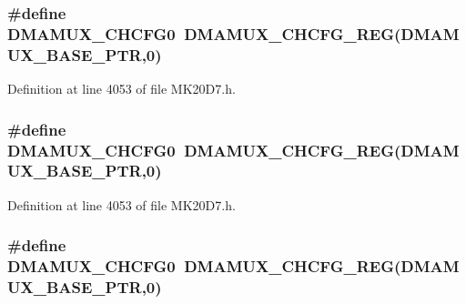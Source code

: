 \subsubsection[{\texorpdfstring{D\+M\+A\+M\+U\+X\+\_\+\+C\+H\+C\+F\+G0}{DMAMUX_CHCFG0}}]{\setlength{\rightskip}{0pt plus 5cm}\#define D\+M\+A\+M\+U\+X\+\_\+\+C\+H\+C\+F\+G0~{\bf D\+M\+A\+M\+U\+X\+\_\+\+C\+H\+C\+F\+G\+\_\+\+R\+EG}({\bf D\+M\+A\+M\+U\+X\+\_\+\+B\+A\+S\+E\+\_\+\+P\+TR},0)}\hypertarget{group___d_m_a_m_u_x___register___accessor___macros_gaf1b9c5ddea4b98f2bbe2679878579c15}{}\label{group___d_m_a_m_u_x___register___accessor___macros_gaf1b9c5ddea4b98f2bbe2679878579c15}


Definition at line 4053 of file M\+K20\+D7.\+h.

\subsubsection[{\texorpdfstring{D\+M\+A\+M\+U\+X\+\_\+\+C\+H\+C\+F\+G0}{DMAMUX_CHCFG0}}]{\setlength{\rightskip}{0pt plus 5cm}\#define D\+M\+A\+M\+U\+X\+\_\+\+C\+H\+C\+F\+G0~{\bf D\+M\+A\+M\+U\+X\+\_\+\+C\+H\+C\+F\+G\+\_\+\+R\+EG}({\bf D\+M\+A\+M\+U\+X\+\_\+\+B\+A\+S\+E\+\_\+\+P\+TR},0)}\hypertarget{group___d_m_a_m_u_x___register___accessor___macros_gaf1b9c5ddea4b98f2bbe2679878579c15}{}\label{group___d_m_a_m_u_x___register___accessor___macros_gaf1b9c5ddea4b98f2bbe2679878579c15}


Definition at line 4053 of file M\+K20\+D7.\+h.

\subsubsection[{\texorpdfstring{D\+M\+A\+M\+U\+X\+\_\+\+C\+H\+C\+F\+G0}{DMAMUX_CHCFG0}}]{\setlength{\rightskip}{0pt plus 5cm}\#define D\+M\+A\+M\+U\+X\+\_\+\+C\+H\+C\+F\+G0~{\bf D\+M\+A\+M\+U\+X\+\_\+\+C\+H\+C\+F\+G\+\_\+\+R\+EG}({\bf D\+M\+A\+M\+U\+X\+\_\+\+B\+A\+S\+E\+\_\+\+P\+TR},0)}\hypertarget{group___d_m_a_m_u_x___register___accessor___macros_gaf1b9c5ddea4b98f2bbe2679878579c15}{}\label{group___d_m_a_m_u_x___register___accessor___macros_gaf1b9c5ddea4b98f2bbe2679878579c15}



